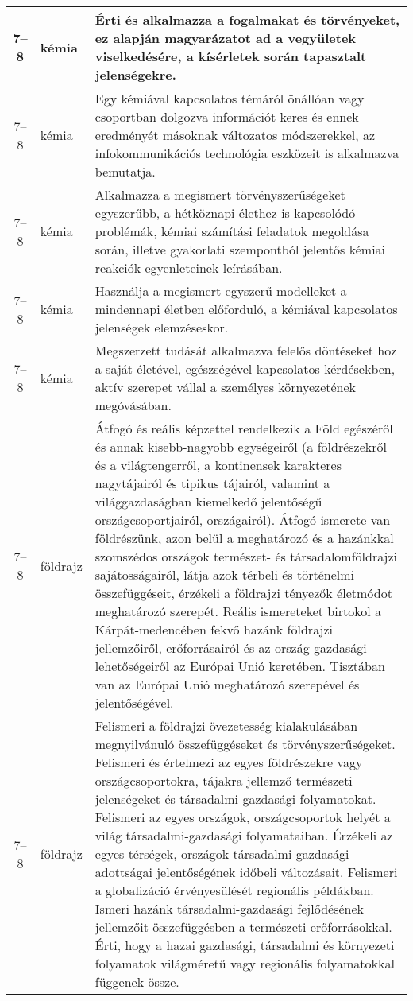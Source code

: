 \begin{small}
\begin{longtable}{c | p{2cm} |  p{11cm} }
              7--8 & kémia & Érti és alkalmazza a fogalmakat és törvényeket, ez alapján magyarázatot ad a vegyületek viselkedésére, a kísérletek során tapasztalt jelenségekre. \\ \hline
              7--8 & kémia & Egy kémiával kapcsolatos témáról önállóan vagy csoportban dolgozva információt keres és ennek eredményét másoknak változatos módszerekkel, az infokommunikációs technológia eszközeit is alkalmazva bemutatja. \\ \hline
              7--8 & kémia & Alkalmazza a megismert törvényszerűségeket egyszerűbb, a hétköznapi élethez is kapcsolódó problémák, kémiai számítási feladatok megoldása során, illetve gyakorlati szempontból jelentős kémiai reakciók egyenleteinek leírásában. \\ \hline
              7--8 & kémia & Használja a megismert egyszerű modelleket a mindennapi életben előforduló, a kémiával kapcsolatos jelenségek elemzéseskor. \\ \hline
              7--8 & kémia & Megszerzett tudását alkalmazva felelős döntéseket hoz a saját életével, egészségével kapcsolatos kérdésekben, aktív szerepet vállal a személyes környezetének megóvásában. \\ \hline
              7--8 & földrajz & Átfogó és reális képzettel rendelkezik a Föld egészéről és annak kisebb-nagyobb egységeiről (a földrészekről és a világtengerről, a kontinensek karakteres nagytájairól és tipikus tájairól, valamint a világgazdaságban kiemelkedő jelentőségű országcsoportjairól, országairól). Átfogó ismerete van földrészünk, azon belül a meghatározó és a hazánkkal szomszédos országok természet- és társadalomföldrajzi sajátosságairól, látja azok térbeli és történelmi összefüggéseit, érzékeli a földrajzi tényezők életmódot meghatározó szerepét. Reális ismereteket birtokol a Kárpát-medencében fekvő hazánk földrajzi jellemzőiről, erőforrásairól és az ország gazdasági lehetőségeiről az Európai Unió keretében. Tisztában van az Európai Unió meghatározó szerepével és jelentőségével. \\ \hline
              7--8 & földrajz & Felismeri a földrajzi övezetesség kialakulásában megnyilvánuló összefüggéseket és törvényszerűségeket. Felismeri és értelmezi az egyes földrészekre vagy országcsoportokra, tájakra jellemző természeti jelenségeket és  társadalmi-gazdasági folyamatokat. Felismeri az egyes országok, országcsoportok helyét a világ társadalmi-gazdasági folyamataiban. Érzékeli az egyes térségek, országok társadalmi-gazdasági adottságai jelentőségének időbeli változásait. Felismeri a globalizáció érvényesülését regionális példákban. Ismeri hazánk társadalmi-gazdasági fejlődésének jellemzőit összefüggésben a természeti erőforrásokkal. Érti, hogy a hazai gazdasági, társadalmi és környezeti folyamatok világméretű vagy regionális folyamatokkal függenek össze. \\ \hline

\end{longtable}
\end{small}
